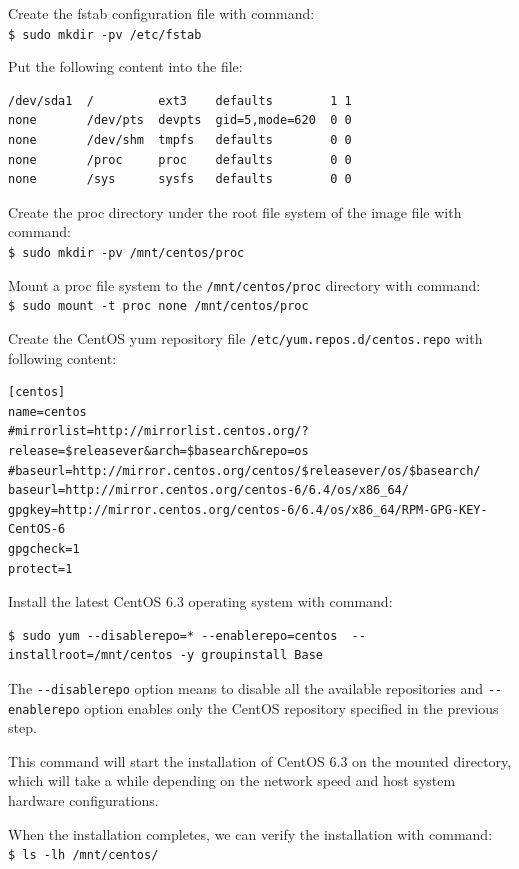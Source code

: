 Create the fstab configuration file with command: \\
\verb|$ sudo mkdir -pv /etc/fstab|


Put the following content into the file:
\lstset{style=bashstyle}
\begin{lstlisting}
/dev/sda1  /         ext3    defaults        1 1
none       /dev/pts  devpts  gid=5,mode=620  0 0
none       /dev/shm  tmpfs   defaults        0 0
none       /proc     proc    defaults        0 0
none       /sys      sysfs   defaults        0 0
\end{lstlisting}


Create the proc directory under the root file system of the image file with command: \\
\verb|$ sudo mkdir -pv /mnt/centos/proc|


Mount a proc file system to the \verb|/mnt/centos/proc| directory with command: \\
\verb|$ sudo mount -t proc none /mnt/centos/proc|


Create the CentOS yum repository file \verb|/etc/yum.repos.d/centos.repo| with following content:
\lstset{style=bashstyle}
\begin{lstlisting}
[centos]
name=centos
#mirrorlist=http://mirrorlist.centos.org/?release=$releasever&arch=$basearch&repo=os
#baseurl=http://mirror.centos.org/centos/$releasever/os/$basearch/
baseurl=http://mirror.centos.org/centos-6/6.4/os/x86_64/
gpgkey=http://mirror.centos.org/centos-6/6.4/os/x86_64/RPM-GPG-KEY-CentOS-6
gpgcheck=1
protect=1
\end{lstlisting}


Install the latest CentOS 6.3 operating system with command:
\lstset{style=bashstyle}
\begin{lstlisting}
$ sudo yum --disablerepo=* --enablerepo=centos  --installroot=/mnt/centos -y groupinstall Base
\end{lstlisting}

The \verb|--disablerepo| option means to disable all the available repositories and \verb|--enablerepo| option enables only the CentOS repository specified in the previous step.

This command will start the installation of CentOS 6.3 on the mounted directory, which will take a while depending on the network speed and host system hardware configurations.


When the installation completes, we can verify the installation with command:\\
\verb|$ ls -lh /mnt/centos/|

